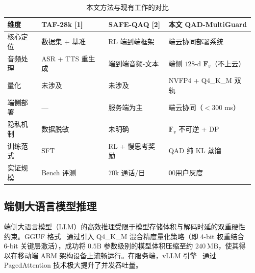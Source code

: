 \documentclass[11pt, a4paper]{article}
\begin{document}
\begin{table}[htbp]
\centering
\small
\setlength{\abovecaptionskip}{4pt}
\setlength{\belowcaptionskip}{3pt}

\caption{本文方法与现有工作的对比}
\label{tab1}

\renewcommand{\arraystretch}{1.15}
\setlength{\tabcolsep}{6pt}

\begin{tabular}{>{\centering\arraybackslash}m{2.2cm}
                >{\raggedright\arraybackslash}m{3.5cm}
                >{\raggedright\arraybackslash}m{3.5cm}
                >{\raggedright\arraybackslash}m{5cm}}
\toprule

\textbf{维度} &
\textbf{TAF-28k [1]} &
\textbf{SAFE-QAQ [2]} &
\textbf{本文 QAD-MultiGuard} \\

\midrule

核心定位 
& 数据集 + 基准 
& RL 端到端框架 
& 端云协同部署系统 \\

音频处理 
& ASR + TTS 重生成 
& 端到端音频-文本 
& 端侧 $128$-d $\mathbf{F}_v$（不上云） \\

量化 
& 未涉及 
& 未涉及 
& NVFP4 + Q4\_K\_M 双轨 \\

端侧部署 
& --- 
& 服务端为主 
& 端云协同（$<300$ ms） \\

隐私机制 
& 数据脱敏 
& 未明确 
& $\mathbf{F}_v$ 不可逆 + DP \\

训练范式 
& SFT 
& RL + 慢思考奖励 
& QAD 纯 KL 蒸馏 \\

实证规模 
& Bench 评测 
& 70k 通话/日 
& 5{,}00用户灰度 \\

\bottomrule
\end{tabular}

\end{table}

\subsection{端侧大语言模型推理}
端侧大语言模型（LLM）的高效推理受限于模型存储体积与解码时延的双重硬性约束。GGUF 格式~\cite{17} 通过引入 Q4\_K\_M 混合精度量化策略（即 4-bit 权重结合 6-bit 关键层激活），成功将 $0.5\text{B}$ 参数级别的模型体积压缩至约 $240~\text{MB}$，使其得以在移动端 ARM 架构设备上流畅运行。在服务端，vLLM 引擎~\cite{18} 通过 PagedAttention 技术极大提升了并发吞吐量。
\end{document}
